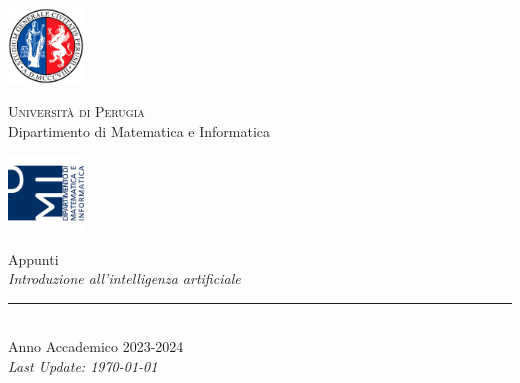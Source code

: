 
\thispagestyle{empty} %

\noindent %
\includegraphics[width=0.15\textwidth]{frontmatter/imgs/logoUniPg.jpg}
\begin{minipage}[b]{0.7\textwidth}
    \centering
    {\Large \textsc{Universit{\`a} di Perugia}}\\
    \vspace{0.4 em}
    {\large Dipartimento di Matematica e Informatica}
    \vspace{0.6 em}
\end{minipage}%
\includegraphics[width=0.15\textwidth]{frontmatter/imgs/logoDMI.jpg}

\vspace{8 em}

\begin{center}
    {\Huge Appunti}\\
    \vspace{1 em}
    {\Huge \textit{Introduzione all'intelligenza artificiale}}\\
    \vspace{5 em}

    \vfill

    \rule{380pt}{.4pt}\\
    \vspace{1.2 em}
    \large{Anno Accademico 2023-2024}\\ %
    \vspace{.9 em}
    \small{\textit{Last Update: \today{}}}
\end{center}

